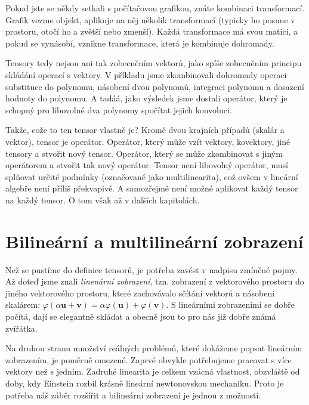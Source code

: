 \documentclass[a5paper,12pt]{amsbook}
\theoremstyle{definition}
\newcommand{\myvec}[1]{\mathbf{#1}}
\begin{document}
Pokud jste se někdy setkali s počítačovou grafikou, znáte kombinaci transformací. Grafik vezme objekt,
aplikuje na něj několik transformací (typicky ho posune v prostoru, otočí ho a zvětší nebo zmenší).
Každá transformace má svou matici, a pokud se vynásobí, vznikne transformace, která je kombinuje
dohromady.

Tensory tedy nejsou ani tak zobecněním vektorů, jako spíše zobecněním principu skládání operací s vektory.
V příkladu jsme zkombinovali dohromady operaci substituce do polynomu, násobení dvou polynomů, integraci
polynomu a dosazení hodnoty do polynomu. A tadáá, jako výsledek jsme dostali operátor, který je schopný
pro libovolné dva polynomy spočítat jejich konvoluci.

Takže, cože to ten tensor vlastně je? Kromě dvou krajních případů (skalár a vektor), tensor je operátor.
Operátor, který může vzít vektory, kovektory, jiné tensory a stvořit nový tensor. Operátor, který se může
zkombinovat s jiným operátorem a stvořit tak nový operátor. Tensor není libovolný operátor, musí splňovat
určité podmínky (označované jako multilinearita), což ovšem v lineární algebře není příliš překvapivé.
A samozřejmě není možné aplikovat každý tensor na každý tensor. O tom však až v dalších kapitolách.

\section{Bilineární a multilineární zobrazení}

\noindent
Než se pustíme do definice tensorů, je potřeba zavést v nadpisu zmíněné pojmy. Až doteď jsme znali
\textit{linenární zobrazení}, tzn. zobrazení z vektorového prostoru do jiného vektorového prostoru,
které zachovávalo sčítání vektorů a násobení skalárem: $\varphi(\alpha\myvec{u} + \myvec{v}) =
\alpha\varphi(\myvec{u}) + \varphi(\myvec{v})$. S lineárními zobrazeními se dobře počítá, dají se
elegantně skládat a obecně jsou to pro nás již dobře známá zvířátka.

Na druhou stranu množství reálných problémů, které dokážeme popsat lineárním zobrazením, je poměrně
omezené. Zaprvé obvykle potřebujeme pracovat s více vektory než s jedním. Zadruhé linearita je celkem
vzácná vlastnost, obzvláště od doby, kdy Einstein rozbil krásně lineární newtonovskou mechaniku.
Proto je potřeba náš záběr rozšířit a bilineární zobrazení je jednou z možností.
\end{document}
